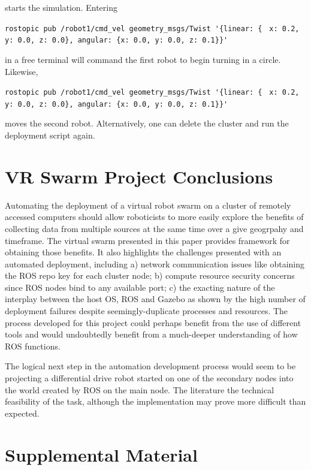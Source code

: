 \documentclass[9pt,twocolumn,twoside]{../../styles/osajnl}
\begin{document}
\parindent0pt starts the simulation.  Entering 

{\lstinline[style=BashInputStyle]!rostopic pub /robot1/cmd_vel geometry_msgs/Twist '{linear: { !} {\lstinline[style=BashInputStyle]!x: 0.2, y: 0.0, z: 0.0}, angular: {x: 0.0, y: 0.0, z: 0.1}}'! }

\parindent0pt in a free terminal will command the first robot to begin turning in a circle.  Likewise, 

{\lstinline[style=BashInputStyle]!rostopic pub /robot1/cmd_vel geometry_msgs/Twist '{linear: { !} {\lstinline[style=BashInputStyle]!x: 0.2, y: 0.0, z: 0.0}, angular: {x: 0.0, y: 0.0, z: 0.1}}'! }

moves the second robot. Alternatively, one can delete the cluster and run the deployment script again.

\section{VR Swarm Project Conclusions}
Automating the deployment of a virtual robot swarm on a cluster of remotely accessed computers should allow roboticists to more easily explore the benefits of collecting data from multiple sources at the same time over a give geogrpahy and timeframe.  The virtual swarm presented in this paper provides framework for obtaining those benefits. It also highlights the challenges presented with an automated deployment, including a) network communication issues like obtaining the ROS repo key for each cluster node; b) compute resource security concerns since ROS nodes bind to any available port; c) the exacting nature of the interplay between the host OS, ROS and Gazebo as shown by the high number of deployment failures despite seemingly-duplicate processes and resources.  The process developed for this project could perhaps benefit from the use of different tools and would undoubtedly benefit from a much-deeper understanding of how ROS functions.

The logical next step in the automation development process would seem to be projecting a differential drive robot started on one of the secondary nodes into the world created by ROS on the main node.  The literature the technical feasibility of the task, although the implementation may prove more difficult than expected.

\section{Supplemental Material}
\end{document}
